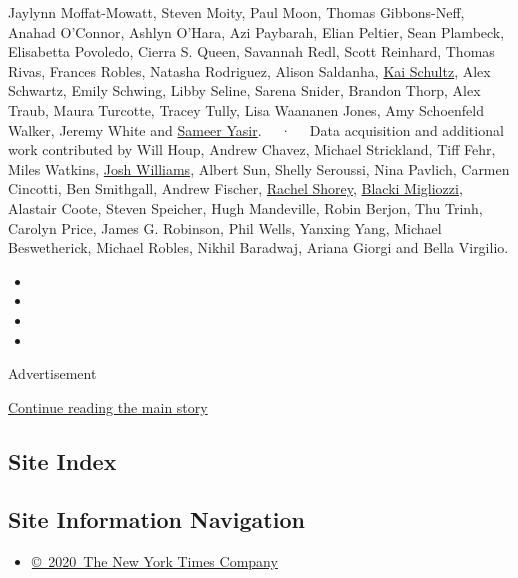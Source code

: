 Jaylynn Moffat-Mowatt, Steven Moity, Paul Moon, Thomas Gibbons-Neff,
Anahad O'Connor, Ashlyn O'Hara, Azi Paybarah, Elian Peltier, Sean
Plambeck, Elisabetta Povoledo, Cierra S. Queen, Savannah Redl, Scott
Reinhard, Thomas Rivas, Frances Robles, Natasha Rodriguez, Alison
Saldanha, \href{https://www.nytimes3xbfgragh.onion/by/kai-schultz}{Kai
Schultz}, Alex Schwartz, Emily Schwing, Libby Seline, Sarena Snider,
Brandon Thorp, Alex Traub, Maura Turcotte, Tracey Tully, Lisa Waananen
Jones, Amy Schoenfeld Walker, Jeremy White and
\href{https://www.nytimes3xbfgragh.onion/by/sameer-yasir}{Sameer Yasir}.
~~·~~ Data acquisition and additional work contributed by Will Houp,
Andrew Chavez, Michael Strickland, Tiff Fehr, Miles Watkins,
\href{https://www.nytimes3xbfgragh.onion/by/josh-williams}{Josh
Williams}, Albert Sun, Shelly Seroussi, Nina Pavlich, Carmen Cincotti,
Ben Smithgall, Andrew Fischer,
\href{https://www.nytimes3xbfgragh.onion/by/rachel-shorey}{Rachel
Shorey},
\href{https://www.nytimes3xbfgragh.onion/by/blacki-migliozzi}{Blacki
Migliozzi}, Alastair Coote, Steven Speicher, Hugh Mandeville, Robin
Berjon, Thu Trinh, Carolyn Price, James G. Robinson, Phil Wells, Yanxing
Yang, Michael Beswetherick, Michael Robles, Nikhil Baradwaj, Ariana
Giorgi and Bella Virgilio.

\begin{itemize}
\item
\item
\item
\item
\end{itemize}

Advertisement

\protect\hyperlink{after-bottom}{Continue reading the main story}

\hypertarget{site-index}{%
\subsection{Site Index}\label{site-index}}

\hypertarget{site-information-navigation}{%
\subsection{Site Information
Navigation}\label{site-information-navigation}}

\begin{itemize}
\tightlist
\item
  \href{https://help.nytimes3xbfgragh.onion/hc/en-us/articles/115014792127-Copyright-notice}{©~2020~The
  New York Times Company}
\end{itemize}

